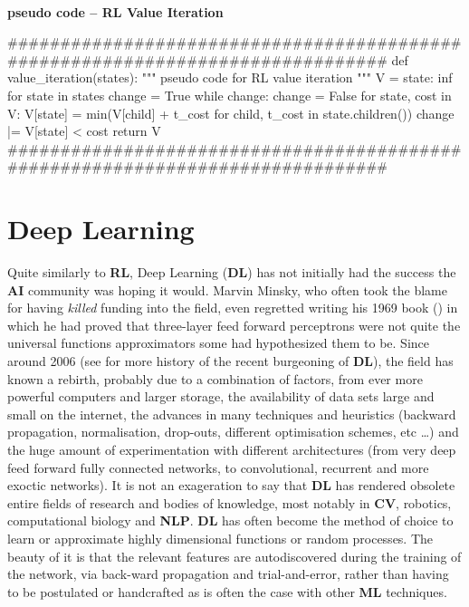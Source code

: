 \paragraph{}{\textbf{pseudo code -- \textbf{RL} Value Iteration}}
\begin{pseudocode}
###############################################################################
def value_iteration(states):
    """ pseudo code for RL value iteration """
    V = {state: inf for state in states}
    change = True
    while change:
        change = False
        for state, cost in V:
            V[state] = min(V[child] + t_cost for child, t_cost in state.children())
            change |= V[state] < cost
    return V 
###############################################################################
\end{pseudocode}
\black





\section{Deep Learning}

Quite similarly to \textbf{RL}, Deep Learning (\textbf{DL}) has not initially had the success the \textbf{AI} community was hoping it would. Marvin Minsky, who often took the blame for having \textit{killed} funding into the field, even regretted writing his 1969 book (\cite{minskypapert69}) in which he had proved that three-layer feed forward perceptrons were not quite the universal functions approximators some had hypothesized them to be. Since around 2006 (see \cite{GoodBengCour16} for more history of the recent burgeoning of \textbf{DL}), the field has known a rebirth, probably due to a combination of factors, from ever more powerful computers and larger storage, the availability of data sets large and small on the internet, the advances in many techniques and heuristics (backward propagation, normalisation, drop-outs, different optimisation schemes, etc \dots) and the huge amount of experimentation with different architectures (from very deep feed forward fully connected networks, to convolutional, recurrent and more exoctic networks). It is not an exageration to say that \textbf{DL} has rendered obsolete entire fields of research and bodies of knowledge, most notably in \textbf{CV}, robotics, computational biology and \textbf{NLP}. \textbf{DL} has often become the method of choice to learn or approximate highly dimensional functions or random processes. The beauty of it is that the relevant features are autodiscovered during the training of the network, via back-ward propagation and trial-and-error, rather than having to be postulated or handcrafted as is often the case with other \textbf{ML} techniques.

